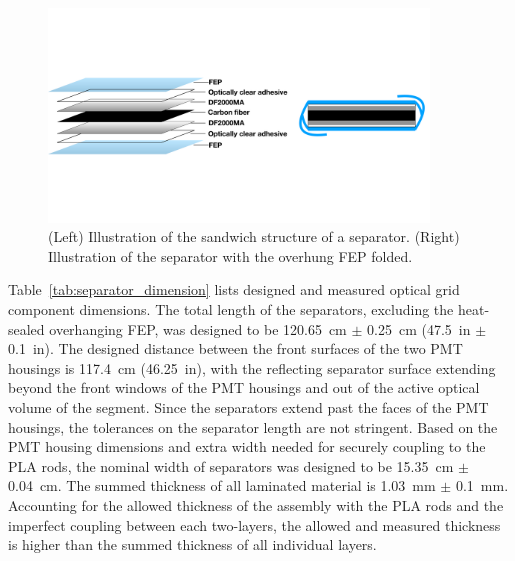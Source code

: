 \begin{figure}[h!]
\centering
\includegraphics[trim = 0.0cm 8.0cm 0.0cm 10.0cm, clip=true, width=0.9\textwidth]{Figures/panel_schematic2.pdf} 
\caption[Illustration of a separators sandwich structure]{(Left) Illustration of the sandwich structure of a separator. 
(Right) Illustration of the separator with the overhung FEP folded. }
\label{fig:panel_scheme}
\end{figure}

Table~\ref{tab:separator_dimension} lists designed and measured optical grid component dimensions.
The total length of the separators, excluding the heat-sealed overhanging FEP, was designed to be 120.65~cm $\pm$ 0.25~cm (47.5~in $\pm$ 0.1~in).  
The designed distance between the front surfaces of the two PMT housings is 117.4~cm (46.25~in), with the reflecting separator surface extending beyond the front windows of the PMT housings and out of the active optical volume of the segment.  
Since the separators extend past the faces of the PMT housings, the tolerances on the separator length are not stringent.  
Based on the PMT housing dimensions and extra width needed for securely coupling to the PLA rods, the nominal width of separators was designed to be 15.35~cm $\pm$ 0.04~cm.
The summed thickness of all laminated material is 1.03~mm $\pm$ 0.1~mm.
Accounting for the allowed thickness of the assembly with the PLA rods and the imperfect coupling between each two-layers, the allowed and measured thickness is higher than the summed thickness of all individual layers.

